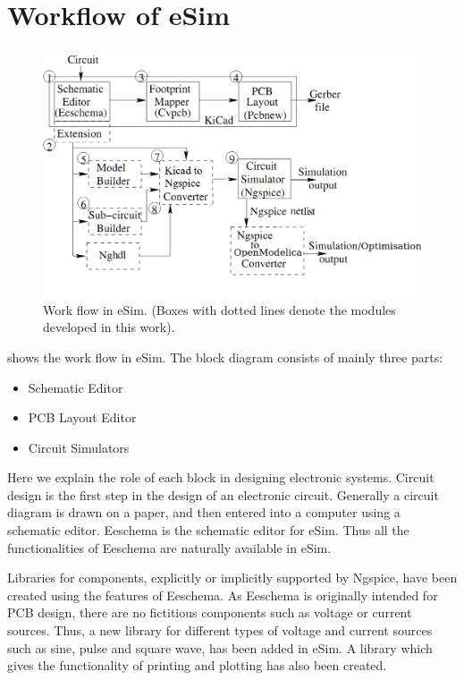 \section {Workflow of eSim}

\begin{figure}
\centering
\includegraphics[width=\hgfig]
{blockdiagram.png}
\caption{Work flow in eSim. (Boxes with dotted lines denote
  the modules developed in this work).}
\label{blockd}
\end{figure}

 shows the work flow in eSim. The block diagram consists of mainly three parts: 
\begin{itemize}
\item Schematic Editor 
\item PCB Layout Editor  
\item Circuit Simulators
\end{itemize} 



%
Here we explain the role of each block in designing electronic
systems. Circuit design is the first step in the design of an electronic
circuit. Generally a circuit diagram is drawn on a paper, and then
entered into a computer using a schematic editor. Eeschema is the
schematic editor for eSim. Thus all the functionalities of Eeschema
are naturally available in eSim.  

Libraries for
components, explicitly or implicitly supported by Ngspice, have been
created using the features of Eeschema. As Eeschema is originally intended for PCB design, there are
no fictitious components such as voltage or current sources. Thus, a
new library for different types of voltage and current sources such as
sine, pulse and square wave, has been added in eSim. A library
which gives the functionality of printing and plotting has also been
created. 

